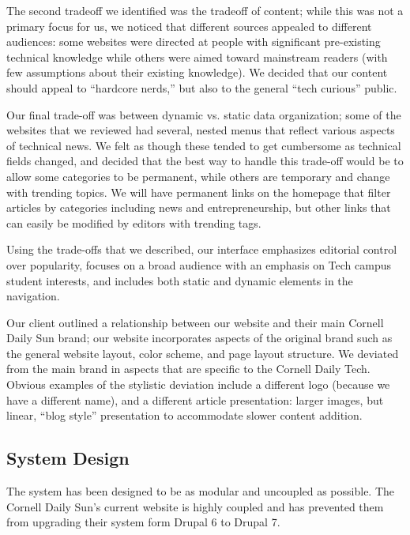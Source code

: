 \documentclass[10pt]{article} %
\begin{document}
The second tradeoff we identified was the tradeoff of content; while this was not a primary focus for us, we noticed that different sources appealed to different audiences: some websites were directed at people with significant pre-existing technical knowledge while others were aimed toward mainstream readers (with few assumptions about their existing knowledge). We decided that our content should appeal to “hardcore nerds,” but also to the general “tech curious” public.
                
Our final trade-off was between dynamic vs. static data organization; some of the websites that we reviewed had several, nested menus that reflect various aspects of technical news. We felt as though these tended to get cumbersome as technical fields changed, and decided that the best way to handle this trade-off would be to allow some categories to be permanent, while others are temporary and change with trending topics. We will have permanent links on the homepage that filter articles by categories including news and entrepreneurship, but other links that can easily be modified by editors with trending tags.
            
Using the trade-offs that we described, our interface emphasizes editorial control over popularity, focuses on a broad audience with an emphasis on Tech campus student interests, and includes both static and dynamic elements in the navigation.
            
Our client outlined a relationship between our website and their main Cornell Daily Sun brand; our website incorporates aspects of the original brand such as the general website layout, color scheme, and page layout structure. We deviated from the main brand in aspects that are specific to the Cornell Daily Tech. Obvious examples of the stylistic deviation include a different logo (because we have a different name), and a different article presentation: larger images, but linear, “blog style” presentation to accommodate slower content addition. 

\subsection{System Design}

The system has been designed to be as modular and uncoupled as possible. The Cornell Daily Sun’s current website is highly coupled and has prevented them from upgrading their system form Drupal 6 to Drupal 7.
\end{document}
